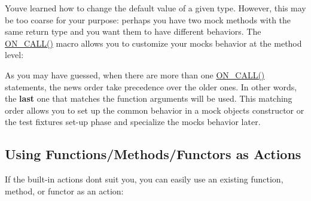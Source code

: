 You\textquotesingle{}ve learned how to change the default value of a given type. However, this may be too coarse for your purpose\+: perhaps you have two mock methods with the same return type and you want them to have different behaviors. The {\ttfamily \mbox{\hyperlink{googletest-master_2googlemock_2include_2gmock_2gmock-spec-builders_8h_a5b12ae6cf84f0a544ca811b380c37334}{O\+N\+\_\+\+C\+A\+L\+L()}}} macro allows you to customize your mock\textquotesingle{}s behavior at the method level\+:


\begin{DoxyCode}{0}
\DoxyCodeLine{}
\DoxyCodeLine{}
\end{DoxyCode}


As you may have guessed, when there are more than one {\ttfamily \mbox{\hyperlink{googletest-master_2googlemock_2include_2gmock_2gmock-spec-builders_8h_a5b12ae6cf84f0a544ca811b380c37334}{O\+N\+\_\+\+C\+A\+L\+L()}}} statements, the news order take precedence over the older ones. In other words, the {\bfseries{last}} one that matches the function arguments will be used. This matching order allows you to set up the common behavior in a mock object\textquotesingle{}s constructor or the test fixture\textquotesingle{}s set-\/up phase and specialize the mock\textquotesingle{}s behavior later.

\subsection*{Using Functions/\+Methods/\+Functors as Actions}

If the built-\/in actions don\textquotesingle{}t suit you, you can easily use an existing function, method, or functor as an action\+:



